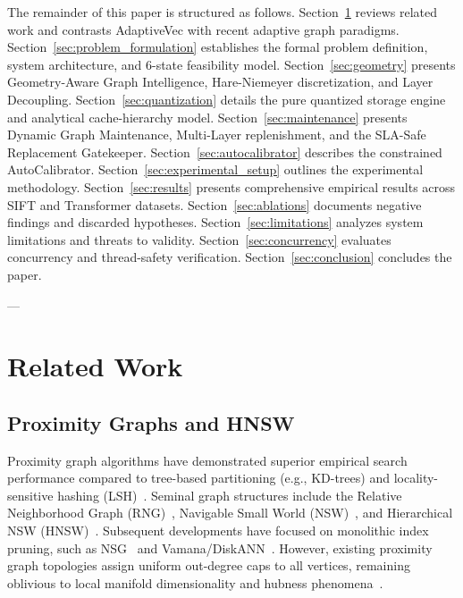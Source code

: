 \documentclass[10pt,journal,compsoc]{IEEEtran}
\begin{document}
The remainder of this paper is structured as follows. Section~\ref{sec:related_work} reviews related work and contrasts AdaptiveVec with recent adaptive graph paradigms. Section~\ref{sec:problem_formulation} establishes the formal problem definition, system architecture, and 6-state feasibility model. Section~\ref{sec:geometry} presents Geometry-Aware Graph Intelligence, Hare-Niemeyer discretization, and Layer Decoupling. Section~\ref{sec:quantization} details the pure quantized storage engine and analytical cache-hierarchy model. Section~\ref{sec:maintenance} presents Dynamic Graph Maintenance, Multi-Layer replenishment, and the SLA-Safe Replacement Gatekeeper. Section~\ref{sec:autocalibrator} describes the constrained AutoCalibrator. Section~\ref{sec:experimental_setup} outlines the experimental methodology. Section~\ref{sec:results} presents comprehensive empirical results across SIFT and Transformer datasets. Section~\ref{sec:ablations} documents negative findings and discarded hypotheses. Section~\ref{sec:limitations} analyzes system limitations and threats to validity. Section~\ref{sec:concurrency} evaluates concurrency and thread-safety verification. Section~\ref{sec:conclusion} concludes the paper.

---

\section{Related Work}
\label{sec:related_work}

\subsection{Proximity Graphs and HNSW}
Proximity graph algorithms have demonstrated superior empirical search performance compared to tree-based partitioning (e.g., KD-trees) and locality-sensitive hashing (LSH)~\cite{wang2021comprehensive}. Seminal graph structures include the Relative Neighborhood Graph (RNG)~\cite{toussaint1980relative}, Navigable Small World (NSW)~\cite{malkov2014approximate}, and Hierarchical NSW (HNSW)~\cite{malkov2020efficient}. Subsequent developments have focused on monolithic index pruning, such as NSG~\cite{fu2019fast} and Vamana/DiskANN~\cite{subramanya2019diskann}. However, existing proximity graph topologies assign uniform out-degree caps to all vertices, remaining oblivious to local manifold dimensionality and hubness phenomena~\cite{radovanovic2010hubs}.
\end{document}
